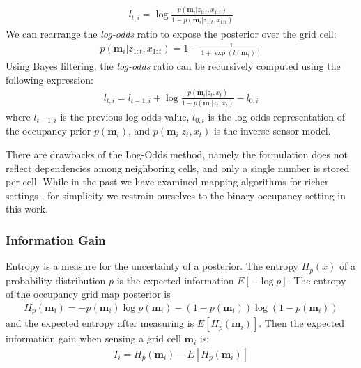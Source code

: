 \documentclass{article}
\begin{document}
\begin{align}
    l_{t,i} = \log\frac{p(\textbf{m}_i | z_{1:t},x_{1:t})}{1-p(\textbf{m}_i | z_{1:t},x_{1:t})}
    \label{log_odd}
\end{align}
We can rearrange the \emph{log-odds} ratio to expose the posterior over the grid cell:
\begin{align}
    p(\textbf{m}_i | z_{1:t},x_{1:t}) = 1-\frac{1}{1+\exp(l(\textbf{m}_i))}
\end{align}
Using Bayes filtering, the \emph{log-odds} ratio can be recursively computed using the following expression: 
\begin{align}
    l_{t,i} = l_{t-1,i} + \log\frac{p(\textbf{m}_i | z_{t},x_{t})}{1-p(\textbf{m}_i | z_{t},x_{t})} - l_{0,i}
\end{align}
\noindent where $l_{t-1,i}$ is the previous log-odds value, $l_{0,i}$ is the log-odds representation of the occupancy prior $p(\textbf{m}_i)$, and $p(\textbf{m}_i | z_{t},x_{t})$ is the inverse sensor model.

There are drawbacks of the Log-Odds method, namely the formulation does not reflect dependencies among neighboring cells, and only a single number is stored per cell.  While in the past we have examined mapping algorithms for richer settings \cite{agha2019confidence}, for simplicity we restrain ourselves to the binary occupancy setting in this work.

\subsubsection{Information Gain}
Entropy is a measure for the uncertainty of a posterior. The entropy $H_p(x)$ of a probability distribution $p$ is the expected information $E[-\log p]$. The entropy of the occupancy grid map posterior is
\begin{align}
    H_p(\textbf{m}_i) = -p(\textbf{m}_i) \log p(\textbf{m}_i) - (1-p(\textbf{m}_i)) \log(1-p(\textbf{m}_i))
\end{align}
\noindent and the expected entropy after measuring is $E[H_{p}(\textbf{m}_i)]$. Then the expected information gain when sensing a grid cell $\textbf{m}_i$ is: 
\begin{align}
    I_i = H_p(\textbf{m}_i) - E[H_{p}(\textbf{m}_i)]
\end{align}
\end{document}
